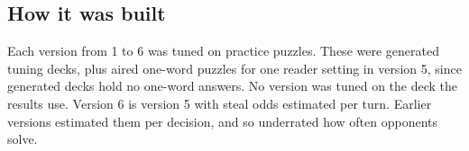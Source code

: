 \subsection{How it was built}

Each version from 1 to 6 was tuned on practice puzzles. These were generated tuning decks, plus aired one-word puzzles for one reader setting in version 5, since generated decks hold no one-word answers. No version was tuned on the deck the results use. Version 6 is version 5 with steal odds estimated per turn. Earlier versions estimated them per decision, and so underrated how often opponents solve.

